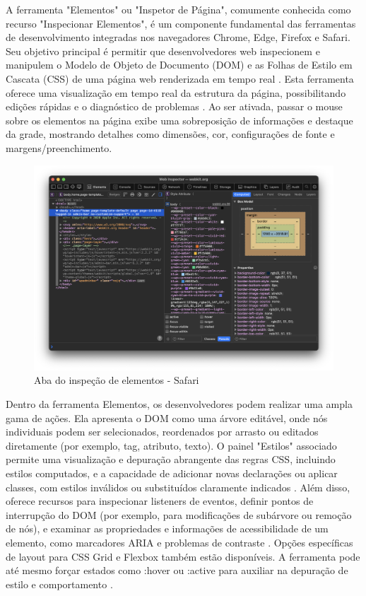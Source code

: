 A ferramenta "Elementos" ou "Inspetor de Página", comumente conhecida como recurso "Inspecionar Elementos", é um componente fundamental das ferramentas de desenvolvimento integradas nos navegadores Chrome, Edge, Firefox e Safari. Seu objetivo principal é permitir que desenvolvedores web inspecionem e manipulem o Modelo de Objeto de Documento (DOM) e as Folhas de Estilo em Cascata (CSS) de uma página web renderizada em tempo real \cite{chrome}. Esta ferramenta oferece uma visualização em tempo real da estrutura da página, possibilitando edições rápidas e o diagnóstico de problemas \cite{chrome}. Ao ser ativada, passar o mouse sobre os elementos na página exibe uma sobreposição de informações e destaque da grade, mostrando detalhes como dimensões, cor, configurações de fonte e margens/preenchimento.

\begin{figure}[h!]
    \centering
    \includegraphics[width=0.7\linewidth]{assets/tools/safari-elements.png}
    \caption{Aba do inspeção de elementos - Safari }
    \label{fig:enter-label}
\end{figure}

Dentro da ferramenta Elementos, os desenvolvedores podem realizar uma ampla gama de ações. Ela apresenta o DOM como uma árvore editável, onde nós individuais podem ser selecionados, reordenados por arrasto ou editados diretamente (por exemplo, tag, atributo, texto). O painel "Estilos" associado permite uma visualização e depuração abrangente das regras CSS, incluindo estilos computados, e a capacidade de adicionar novas declarações ou aplicar classes, com estilos inválidos ou substituídos claramente indicados \cite{edge}. Além disso, oferece recursos para inspecionar listeners de eventos, definir pontos de interrupção do DOM (por exemplo, para modificações de subárvore ou remoção de nós), e examinar as propriedades e informações de acessibilidade de um elemento, como marcadores ARIA e problemas de contraste \cite{apple}. Opções específicas de layout para CSS Grid e Flexbox também estão disponíveis. A ferramenta pode até mesmo forçar estados como :hover ou :active para auxiliar na depuração de estilo e comportamento \cite{edge}.

